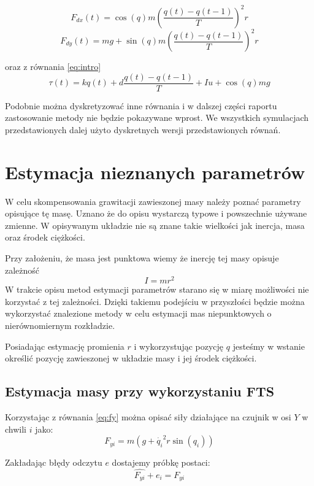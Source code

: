\documentclass[a4paper, 10pt]{article}
\begin{document}
\begin{equation}
F_{dx}(t) = \cos{(q)}m(\frac{q(t)-q(t-1)}{T})^2 r
\end{equation}
\begin{equation}
F_{dy}(t) = mg + \sin{(q)}m(\frac{q(t)-q(t-1)}{T})^2 r
\end{equation}

oraz z równania \ref{eq:intro}
\begin{equation}
\tau(t) = kq(t) + d\frac{q(t)-q(t-1)}{T} + Iu + \cos(q)mg
\end{equation}

Podobnie można dyskretyzować inne równania i w dalszej części raportu zastosowanie metody nie będzie pokazywane wprost. We wszystkich symulacjach przedstawionych dalej użyto dyskretnych wersji przedstawionych równań.

\section{Estymacja nieznanych parametrów}
W celu skompensowania grawitacji zawieszonej masy należy poznać parametry opisujące tę masę. Uznano że do opisu wystarczą typowe i powszechnie używane zmienne. W opisywanym układzie nie są znane takie wielkości jak inercja, masa oraz środek ciężkości. 

Przy założeniu, że masa jest punktowa wiemy że inercję tej masy opisuje zależność
\begin{equation}
I = mr^2
\end{equation}
W trakcie opisu metod estymacji parametrów starano się w miarę możliwości nie korzystać z tej zależności. Dzięki takiemu podejściu w przyszłości będzie można wykorzystać znalezione metody w celu estymacji mas niepunktowych o nierównomiernym rozkładzie. 

Posiadając estymację promienia $r$ i wykorzystując pozycję $q$ jesteśmy w wstanie określić pozycję zawieszonej w układzie masy i jej środek ciężkości.


\subsection{Estymacja masy przy wykorzystaniu FTS}
\label{sec:ftsods}
Korzystając z równania \ref{eq:fy} można opisać siły działające na czujnik w osi $Y$ w chwili $i$ jako:
\begin{equation}
F_{yi}  = m(g + \dot{q_i}^2r\sin{(q_i)})
\end{equation}

Zakładając błędy odczytu $e$ dostajemy próbkę postaci:
\begin{equation}
\hat{F_{yi}}+e_i  = F_{yi}
\end{equation}
\end{document}
